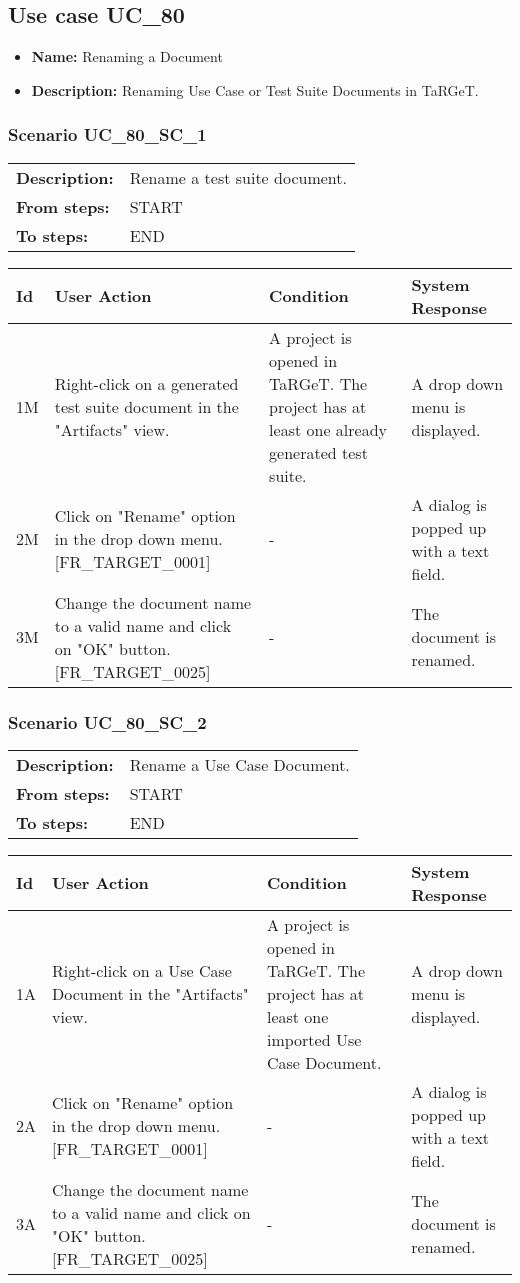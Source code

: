 \documentclass[a4paper,11pt]{article}
\newcommand{\bl}{\\ \hline}
\begin{document}
\subsection*{Use case UC_80}
\begin{itemize}
\item {\bf Name: }Renaming a Document
\item {\bf Description: }Renaming Use Case or Test Suite Documents in TaRGeT.
\end{itemize}
\subsubsection*{Scenario UC_80_SC_1}
\begin{tabular}{p{1in}p{4in}}
{\bf Description:} & Rename a test suite document. \\
{\bf From steps:} & START \\
{\bf To steps:} & END \\
\end{tabular}
 
\begin{tabular}{|p{0.8in}|p{1.6in}|p{1.6in}|p{1.6in}|}
\hline
Id & User Action & Condition & System Response  \bl 
1M & Right-click on a generated test suite document in the "Artifacts" view. & A project is opened in TaRGeT. The project has at least one already generated test suite. & A drop down menu is displayed. \bl 
2M & Click on "Rename" option in the drop down menu. [FR_TARGET_0001] & - & A dialog is popped up with a text field. \bl 
3M & Change the document name to a valid name and click on "OK" button. [FR_TARGET_0025] & - & The document is renamed. \bl 
\end{tabular}
\subsubsection*{Scenario UC_80_SC_2}
\begin{tabular}{p{1in}p{4in}}
{\bf Description:} & Rename a Use Case Document. \\
{\bf From steps:} & START \\
{\bf To steps:} & END \\
\end{tabular}
 
\begin{tabular}{|p{0.8in}|p{1.6in}|p{1.6in}|p{1.6in}|}
\hline
Id & User Action & Condition & System Response  \bl 
1A & Right-click on a Use Case Document in the "Artifacts" view. & A project is opened in TaRGeT. The project has at least one imported Use Case Document. & A drop down menu is displayed. \bl 
2A & Click on "Rename" option in the drop down menu. [FR_TARGET_0001] & - & A dialog is popped up with a text field. \bl 
3A & Change the document name to a valid name and click on "OK" button. [FR_TARGET_0025] & - & The document is renamed. \bl 
\end{tabular}
\end{document}
